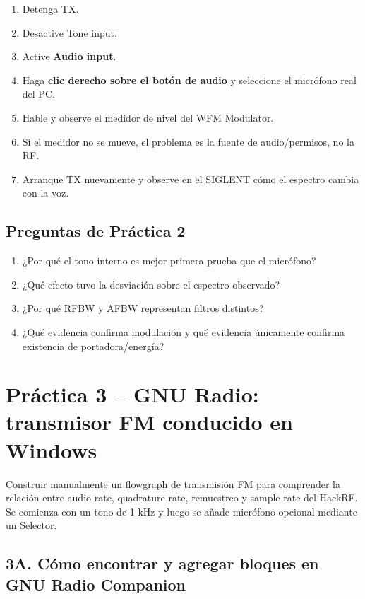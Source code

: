 \begin{enumerate}
    \item Detenga TX.
    \item Desactive Tone input.
    \item Active \textbf{Audio input}.
    \item Haga \textbf{clic derecho sobre el botón de audio} y seleccione el micrófono real del PC.
    \item Hable y observe el medidor de nivel del WFM Modulator.
    \item Si el medidor no se mueve, el problema es la fuente de audio/permisos, no la RF.
    \item Arranque TX nuevamente y observe en el SIGLENT cómo el espectro cambia con la voz.
\end{enumerate}

\subsection{Preguntas de Práctica 2}

\begin{enumerate}
    \item ¿Por qué el tono interno es mejor primera prueba que el micrófono?
    \item ¿Qué efecto tuvo la desviación sobre el espectro observado?
    \item ¿Por qué RFBW y AFBW representan filtros distintos?
    \item ¿Qué evidencia confirma modulación y qué evidencia únicamente confirma existencia de portadora/energía?
\end{enumerate}

\clearpage
\section{Práctica 3 -- GNU Radio: transmisor FM conducido en Windows}

\begin{objetivo}
Construir manualmente un flowgraph de transmisión FM para comprender la relación entre audio rate, quadrature rate, remuestreo y sample rate del HackRF. Se comienza con un tono de 1 kHz y luego se añade micrófono opcional mediante un Selector.
\end{objetivo}

\subsection{3A. Cómo encontrar y agregar bloques en GNU Radio Companion}

